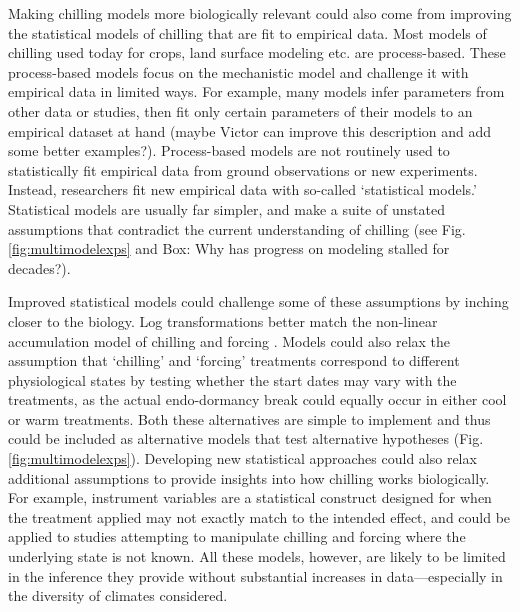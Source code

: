 \documentclass[11pt]{article}
\begin{document}
Making chilling models more biologically relevant could also come from improving the statistical models of chilling that are fit to empirical data. Most models of chilling used today for crops, land surface modeling etc. are process-based. These process-based models focus on the mechanistic model and challenge it with empirical data in limited ways. For example, many models infer parameters from other data or studies, then fit only certain parameters of their models to an empirical dataset at hand \citep{richardson1974} (maybe Victor can improve this description and add some better examples?). Process-based models are not routinely used to statistically fit empirical data from ground observations or new experiments. %
Instead, researchers fit new empirical data with so-called `statistical models.' Statistical models are usually far simpler, and make a suite of unstated assumptions that contradict the current understanding of chilling 
(see Fig.\ref{fig:multimodelexps} and Box: Why has progress on modeling stalled for decades?). %

Improved statistical models could challenge some of these assumptions by inching closer to the biology. Log transformations better match the non-linear accumulation model of chilling and forcing \citep{decsens}. Models could also relax the assumption that ‘chilling’ and ‘forcing’
treatments correspond to different physiological states by testing whether the start dates may vary with the treatments, as the actual endo-dormancy break could equally occur in either cool or warm treatments. 
Both these alternatives are simple to implement and thus could be included as alternative models that test alternative hypotheses (Fig. \ref{fig:multimodelexps}). 
Developing new statistical approaches could also relax additional assumptions to provide insights into how chilling works biologically. For example, instrument variables are a statistical construct designed for when the treatment applied may not exactly match to the intended effect, and could be applied to studies attempting to manipulate chilling and forcing where the underlying state is not known. All these models, however, are likely to be limited in the inference they provide without substantial increases in data---especially in the diversity of climates considered. 
\end{document}
